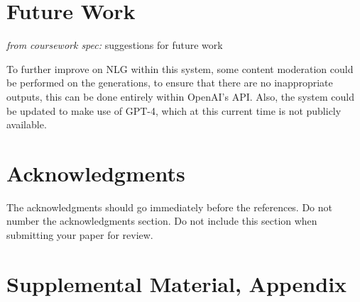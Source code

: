 \documentclass[hidelinks, 11pt]{article}
\begin{document}
\section{Future Work}
\label{sec:future_work}

\textit{from coursework spec:} suggestions for future work

To further improve on NLG within this system, some content moderation could be performed on the generations, to ensure that there are no inappropriate outputs, this can be done entirely within OpenAI's API.  Also, the system could be updated to make use of GPT-4, which at this current time is not publicly available.



\section*{Acknowledgments}
\label{sec:acknowledgments}

The acknowledgments should go immediately before the references.  Do
not number the acknowledgments section. Do not include this section
when submitting your paper for review.

%
%



\appendix

\section{Supplemental Material, Appendix}
\label{sec:supplemental}
\end{document}
